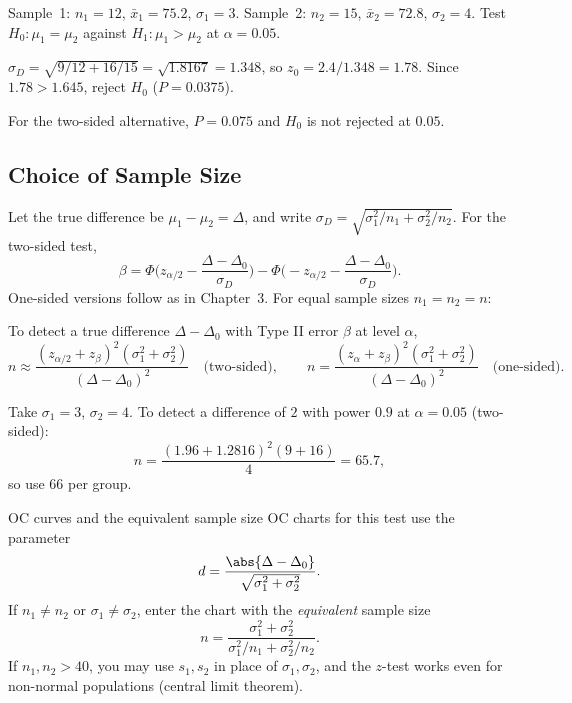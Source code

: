 \begin{example}\label{ex:twoz}
Sample~1: $n_1=12$, $\bar{x}_1=75.2$, $\sigma_1=3$. Sample~2: $n_2=15$, $\bar{x}_2=72.8$, $\sigma_2=4$. Test $H_0:\mu_1=\mu_2$ against $H_1:\mu_1>\mu_2$ at $\alpha=0.05$.

$\sigma_D=\sqrt{9/12+16/15}=\sqrt{1.8167}=1.348$, so $z_0=2.4/1.348=1.78$. Since $1.78>1.645$, reject $H_0$ ($P=0.0375$).

For the two-sided alternative, $P=0.075$ and $H_0$ is not rejected at $0.05$.
\end{example}

\subsection{Choice of Sample Size}

Let the true difference be $\mu_1-\mu_2=\Delta$, and write $\sigma_D=\sqrt{\sigma_1^2/n_1+\sigma_2^2/n_2}$. For the two-sided test,
\[ \beta=\Phi\Big(z_{\alpha/2}-\frac{\Delta-\Delta_0}{\sigma_D}\Big)-\Phi\Big(-z_{\alpha/2}-\frac{\Delta-\Delta_0}{\sigma_D}\Big). \]
One-sided versions follow as in Chapter~3. For equal sample sizes $n_1=n_2=n$:

\begin{theorem}\label{thm:twoz-n}
To detect a true difference $\Delta-\Delta_0$ with Type II error $\beta$ at level $\alpha$,
\[ n\approx\frac{(z_{\alpha/2}+z_\beta)^2(\sigma_1^2+\sigma_2^2)}{(\Delta-\Delta_0)^2}\quad\text{(two-sided)},\qquad n=\frac{(z_\alpha+z_\beta)^2(\sigma_1^2+\sigma_2^2)}{(\Delta-\Delta_0)^2}\quad\text{(one-sided)}. \]
\end{theorem}

\begin{example}
Take $\sigma_1=3$, $\sigma_2=4$. To detect a difference of $2$ with power $0.9$ at $\alpha=0.05$ (two-sided):
\[ n=\frac{(1.96+1.2816)^2(9+16)}{4}=65.7, \]
so use $66$ per group.
\end{example}

\begin{nuance}{OC curves and the equivalent sample size}
OC charts for this test use the parameter
\[ d=\frac{\abs{\Delta-\Delta_0}}{\sqrt{\sigma_1^2+\sigma_2^2}}. \]
If $n_1\ne n_2$ or $\sigma_1\ne\sigma_2$, enter the chart with the \emph{equivalent} sample size
\[ n=\frac{\sigma_1^2+\sigma_2^2}{\sigma_1^2/n_1+\sigma_2^2/n_2}. \]
If $n_1,n_2>40$, you may use $s_1,s_2$ in place of $\sigma_1,\sigma_2$, and the $z$-test works even for non-normal populations (central limit theorem).
\end{nuance}

